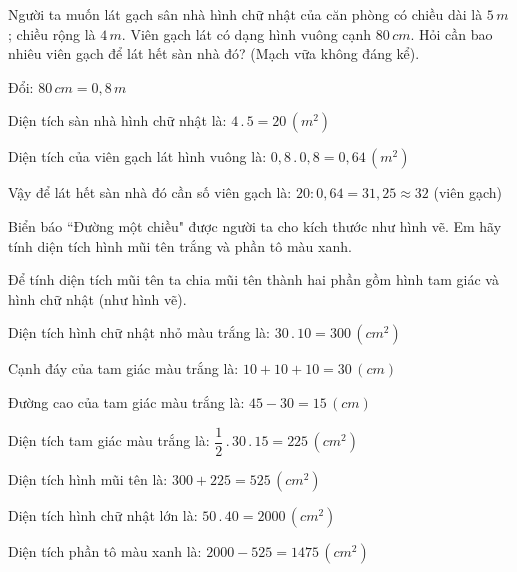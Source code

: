 \begin{bt}
	Người ta muốn lát gạch sân nhà hình chữ nhật của căn phòng có chiều dài là $5\, m$; chiều rộng là $4\, m$. Viên gạch lát có dạng hình vuông cạnh $80\, cm$. Hỏi cần bao nhiêu viên gạch để lát hết sàn nhà đó? (Mạch vữa không đáng kể).
	\begin{loigiaichuong38}
		Đổi: $80\,cm=0,8\,m$
		
		Diện tích sàn nhà hình chữ nhật là: 
		$4\,.\,5=20\,(m^2)$
		
		Diện tích của viên gạch lát hình vuông là: 
		$0,8\,.\,0,8=0,64\,(m^2)$
		
		Vậy để lát hết sàn nhà đó cần số viên gạch là: 
		$20:0,64=31,25\approx 32$ (viên gạch)
	\end{loigiaichuong38}
\end{bt}
\begin{bt}
	Biển báo ``Đường một chiều" được người ta cho kích thước như hình vẽ. Em hãy tính diện tích hình mũi tên trắng và phần tô màu xanh.
	\begin{loigiaichuong38}
		Để tính diện tích mũi tên ta chia mũi tên thành hai phần gồm hình tam giác và hình chữ nhật (như hình vẽ).
		
		Diện tích hình chữ nhật nhỏ màu trắng là: $30\,.\,10=300\,(cm^2)$
		
		Cạnh đáy của tam giác màu trắng là: $10+10+10=30\,(cm)$
		
		Đường cao của tam giác màu trắng là: $45-30=15\,(cm)$
		
		Diện tích tam giác màu trắng là: $\dfrac{1}{2}\,.\,30\,.\,15=225\,(cm^2)$
		
		Diện tích hình mũi tên là: $300+225=525\,(cm^2)$
		
		Diện tích hình chữ nhật lớn là: $50\,.\,40=2000\,(cm^2)$
		
		Diện tích phần tô màu xanh là: $2000-525=1475\,(cm^2)$
	\end{loigiaichuong38}
\end{bt}
